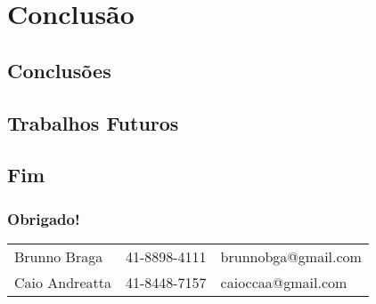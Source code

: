 \section{Conclusão}

\subsection{Conclusões}
    \begin{frame}\frametitle{}
    \end{frame}
    
\subsection{Trabalhos Futuros}
    \begin{frame}\frametitle{}
    \end{frame}
    
\subsection{Fim}
    \begin{frame}\frametitle{Obrigado!}
        \begin{table}[!h]
	        \begin{tabular}{lll}
                Brunno Braga & 41-8898-4111 & brunnobga@gmail.com \\
                Caio Andreatta & 41-8448-7157 & caioccaa@gmail.com \\
	        \end{tabular}
        \end{table}
    \end{frame}
